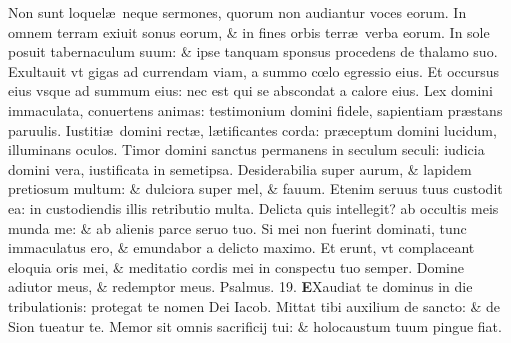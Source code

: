 \documentclass[a5paper,10pt]{book}
\def\ae{æ}
\def\oe{œ}
\begin{document}
\begin{multicols*}{2}
\newline \color{red} N\color{black}on sunt loquel\ae \ neque sermones, quorum non audiantur voces eorum.
\newline \color{red} I\color{black}n omnem terram exiuit sonus eorum, \& in fines orbis terr\ae \ verba eorum.
\newline \color{red} I\color{black}n sole posuit tabernaculum suum: \& ipse tanquam sponsus procedens de thalamo suo.
\newline \color{red} E\color{black}xultauit vt gigas ad currendam viam, a summo c\oe lo egressio eius.
\newline \color{red} E\color{black}t occursus eius vsque ad summum eius: nec est qui se abscondat a calore eius.
\newline \color{red} L\color{black}ex domini immaculata, conuertens animas: testimonium domini fidele, sapientiam pr\ae stans paruulis.
\newline \color{red} I\color{black}ustiti\ae \ domini rect\ae , l\ae tificantes corda: pr\ae ceptum domini lucidum, illuminans oculos.
\newline \color{red} T\color{black}imor domini sanctus permanens in seculum seculi: iudicia domini vera, iustificata in semetipsa.
\newline \color{red} D\color{black}esiderabilia super aurum, \& lapidem pretiosum multum: \& dulciora super mel, \& fauum.
\newline \color{red} E\color{black}tenim seruus tuus custodit ea: in custodiendis illis retributio multa.
\newline \color{red} D\color{black}elicta quis intellegit? ab occultis meis munda me: \& ab alienis parce seruo tuo.
\newline \color{red} S\color{black}i mei non fuerint dominati, tunc immaculatus ero, \& emundabor a delicto maximo.
\newline \color{red} E\color{black}t erunt, vt complaceant eloquia oris mei, \& meditatio cordis mei in conspectu tuo semper.
\newline \color{red} D\color{black}omine adiutor meus, \& redemptor meus. \quad \color{red} Psalmus. \hypertarget{ps19}{19.} \color{black}
\lettrine[lines=2]{\bfseries \color{red} E}{}Xaudiat te dominus in die tribulationis: protegat te nomen Dei Iacob.
\newline \color{red} M\color{black}ittat tibi auxilium de sancto: \& de Sion tueatur te.
\newline \color{red} M\color{black}emor sit omnis sacrificij tui: \& holocaustum tuum pingue fiat.

\end{multicols*}
\end{document}
